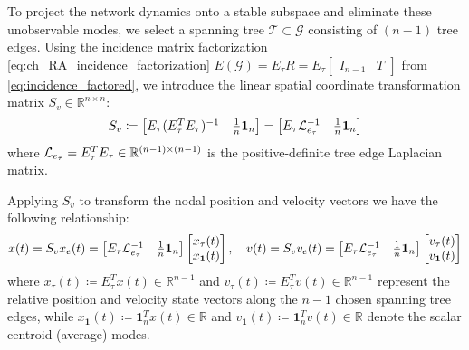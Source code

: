 To project the network dynamics onto a stable subspace and eliminate these unobservable modes, we select a spanning tree $\mathcal{T} \subset \mathcal{G}$ consisting of $(n-1)$ tree edges. Using the incidence matrix factorization \eqref{eq:ch_RA_incidence_factorization} $E(\mathcal{G}) = E_\tau R = E_\tau \begin{bmatrix} I_{n-1} & T \end{bmatrix}$ from \eqref{eq:incidence_factored}, we introduce the linear spatial coordinate transformation matrix $S_v \in \mathbb{R}^{n \times n}$:
\begin{equation}\label{eq:ch_RA_transformation_Sv}
	S_v \coloneqq \begin{bmatrix} E_\tau (E_\tau^T E_\tau)^{-1} & \frac{1}{n} \mathbf{1}_n \end{bmatrix} = \begin{bmatrix} E_\tau \mathcal{L}_{e_{\tau}}^{-1} & \frac{1}{n} \mathbf{1}_n \end{bmatrix}
\end{equation}
where $\mathcal{L}_{e_{\tau}} = E_\tau^T E_\tau \in \mathbb{R}^{(n-1) \times (n-1)}$ is the positive-definite tree edge Laplacian matrix.

Applying $S_v$ to transform the nodal position and velocity vectors we have the following relationship:
\begin{equation}\label{eq:ch_RA_coordinate_change}
	x(t) = S_v x_e(t) = \begin{bmatrix} E_\tau \mathcal{L}_{e_{\tau}}^{-1} & \frac{1}{n} \mathbf{1}_n \end{bmatrix} \begin{bmatrix} x_\tau(t) \\ x_\mathbf{1}(t) \end{bmatrix}, \quad 
	v(t) = S_v v_e(t) = \begin{bmatrix} E_\tau \mathcal{L}_{e_{\tau}}^{-1} & \frac{1}{n} \mathbf{1}_n \end{bmatrix} \begin{bmatrix} v_\tau(t) \\ v_\mathbf{1}(t) \end{bmatrix}
\end{equation}
where $x_\tau(t) \coloneqq E_\tau^T x(t) \in \mathbb{R}^{n-1}$ and $v_\tau(t) \coloneqq E_\tau^T v(t) \in \mathbb{R}^{n-1}$ represent the relative position and velocity state vectors along the $n-1$ chosen spanning tree edges, while $x_\mathbf{1}(t) \coloneqq \mathbf{1}_n^T x(t) \in \mathbb{R}$ and $v_\mathbf{1}(t) \coloneqq \mathbf{1}_n^T v(t) \in \mathbb{R}$ denote the scalar centroid (average) modes.

